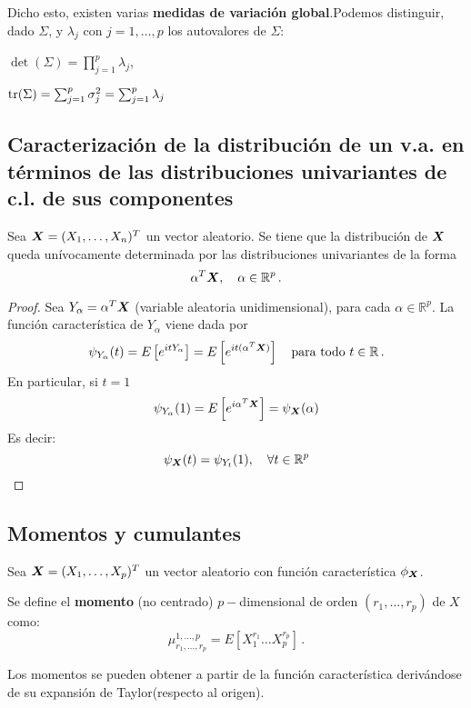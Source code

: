 Dicho esto, existen varias \textbf{medidas de variación global}.Podemos distinguir, dado $\Sigma$, y $\lambda_j$ con $j = 1,\dots,p$ los autovalores de $\Sigma$:
\begin{nlist}
\item $\det(\Sigma) =  \prod_{j=1}^p \lambda_j$,
  \item $\operatorname{tr}(\Sigma) = \sum_{j = 1}^p \sigma_j^2 = \sum_{j=1}^p \lambda_j$
\end{nlist}


\subsection{Caracterización de la distribución de un v.a. en términos de las distribuciones univariantes de c.l. de sus componentes}

\begin{nth} \label{dist_univ}
  Sea $\boldsymbol{X} = (X_1,\dots, X_n)^T$ un vector aleatorio. Se tiene que la distribución de $\boldsymbol{X}$ queda unívocamente determinada por las distribuciones univariantes de la forma
  \[
\alpha ^T \boldsymbol{X}, \quad \alpha \in \mathbb R ^p\,.
  \]
\end{nth}
\begin{proof}
  Sea $Y_\alpha = \alpha^T \boldsymbol{X}$ (variable aleatoria unidimensional), para cada $\alpha \in \mathbb R^p$. La función característica de $Y_\alpha$ viene dada por
  \[
  \psi_{Y_\alpha}(t) = E\left[e^{itY_\alpha}\right] = E \left[e^{it(\alpha^T \boldsymbol{X})}\right] \quad \text{para todo } t \in \mathbb R\,.
  \]
  En particular, si $t=1$
  \[
  \psi_{Y_\alpha}(1) = E\left[e^{i\alpha^T \boldsymbol{X}}\right] = \psi_{\boldsymbol{X}} (\alpha)
  \]
  Es decir:
  \[
  \psi_{\boldsymbol{X}}(t) = \psi_{Y_t}(1), \quad \forall t \in \mathbb R ^p
  \]
\end{proof}

\subsection{Momentos y cumulantes}

Sea $\boldsymbol{X}= (X_1,\dots,X_p)^T$ un vector aleatorio con función característica $\phi_{\boldsymbol{X}}$.
\begin{ndef}
  Se define el \textbf{momento} (no centrado) $p-$dimensional de orden $(r_1, \dots, r_p)$ de $X$ como:
  \[
\mu_{r_1,\dots,r_p}^{1,\dots,p} = E \left[ X_1^{r_1} \dots X_p^{r_p}\right]\,.
  \]
\end{ndef}

Los momentos se pueden obtener a partir de la función característica derivándose de su expansión de Taylor(respecto al origen).

